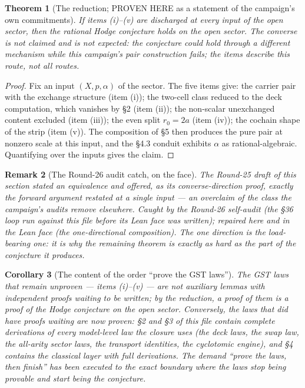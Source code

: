 \documentclass[11pt]{article}
\newtheorem{theorem}{Theorem}
\newtheorem{corollary}[theorem]{Corollary}
\newtheorem{remark}[theorem]{Remark}
\begin{document}
\begin{theorem}[The reduction; PROVEN HERE as a statement of the
campaign's own commitments]
If items \textnormal{(i)--(v)} are discharged at every input of the open
sector, then the rational Hodge conjecture holds on the open sector.
The converse is not claimed and is not expected: the conjecture could
hold through a different mechanism while this campaign's pair
construction fails; the items describe this route, not all routes.
\end{theorem}

\begin{proof}
Fix an input $(X,p,\alpha)$ of the sector. The five items give: the
carrier pair with the exchange structure (item (i)); the two-cell class
reduced to the deck computation, which vanishes by \S2 (item (ii));
the non-scalar unexchanged content excluded (item (iii)); the even
split $r_0=2a$ (item (iv)); the cochain shape of the strip (item (v)).
The composition of \S5 then produces the pure pair at nonzero scale
at this input, and the \S4.3 conduit exhibits $\alpha$ as
rational-algebraic. Quantifying over the inputs gives the claim.
\end{proof}

\begin{remark}[The Round-26 audit catch, on the face]
The Round-25 draft of this section stated an equivalence and offered,
as its converse-direction proof, exactly the forward argument restated
at a single input --- an overclaim of the class the campaign's audits
remove elsewhere. Caught by the Round-26 self-audit (the \S36 loop run
against this file before its Lean face was written); repaired here and
in the Lean face (the one-directional composition). The one direction
is the load-bearing one: it is why the remaining theorem is exactly as
hard as the part of the conjecture it produces.
\end{remark}

\begin{corollary}[The content of the order ``prove the GST laws'']
The GST laws that remain unproven --- items \textnormal{(i)--(v)} ---
are not auxiliary lemmas with independent proofs waiting to be written;
by the reduction, a proof of them is a proof of the Hodge conjecture
on the open sector. Conversely, the laws that \emph{did} have proofs
waiting are now proven: \S2 and \S3 of this file contain complete
derivations of every model-level law the closure uses (the deck laws,
the swap law, the all-arity sector laws, the transport identities, the
cyclotomic engine), and \S4 contains the classical layer with full
derivations. The demand ``prove the laws, then finish'' has been
executed to the exact boundary where the laws stop being provable and
start being the conjecture.
\end{corollary}
\end{document}
